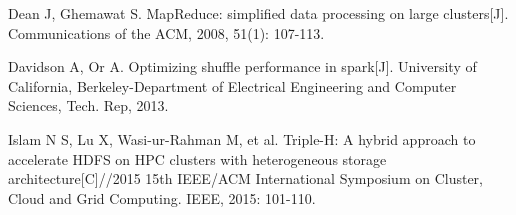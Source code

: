 \documentclass[conference]{IEEEtran}
\begin{document}
\begin{thebibliography}{00}
Dean J, Ghemawat S. MapReduce: simplified data processing on large clusters[J]. Communications of the ACM, 2008, 51(1): 107-113.

Davidson A, Or A. Optimizing shuffle performance in spark[J]. University of California, Berkeley-Department of Electrical Engineering and Computer Sciences, Tech. Rep, 2013.

Islam N S, Lu X, Wasi-ur-Rahman M, et al. Triple-H: A hybrid approach to accelerate HDFS on HPC clusters with heterogeneous storage architecture[C]//2015 15th IEEE/ACM International Symposium on Cluster, Cloud and Grid Computing. IEEE, 2015: 101-110.
\end{thebibliography}
\end{document}
